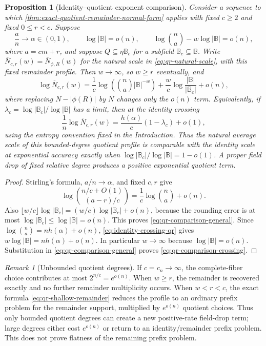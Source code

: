 \documentclass[12pt,a4paper]{amsart}
\numberwithin{equation}{section}
\newtheorem{proposition}[proposition]{Proposition}
\theoremstyle{remark}
\newtheorem{remark}[remark]{Remark}
\newcommand{\B}{\mathbb B}
\begin{document}
\begin{proposition}[Identity--quotient exponent comparison]
\label{prop:identity-quotient-comparison}
Consider a sequence to which
\cref{thm:exact-quotient-remainder-normal-form} applies with fixed
$c\ge2$ and fixed $0\le r<c$.  Suppose
\[
 \frac an\longrightarrow\alpha\in(0,1),\qquad
 \log|\B|=o(n),\qquad
 \log\binom na-w\log|\B|=o(n),                     \tag{QR7}\label{eq:identity-crossing-qr}
\]
where $a=cm+r$, and suppose
\(Q\subseteq\eta\B_c\) for a subfield $\B_c\subseteq\B$.
Write \(\overline N_{c,r}(w)=\overline N_{\phi,R}(w)\) for the natural
scale in \eqref{eq:qr-natural-scale}, with this fixed remainder profile.
Then $w\to\infty$, so $w\ge r$ eventually, and
\[
 \log\overline N_{c,r}(w)
 =\frac1c\log\!\left(\binom na|\B|^{-w}\right)
  +\frac wc\log\frac{|\B|}{|\B_c|}+o(n),           \tag{QR8}\label{eq:qr-comparison-general}
\]
where replacing $N-|\phi(R)|$ by $N$ changes only the $o(n)$ term.
Equivalently, if
\(\lambda_c=\log|\B_c|/\log|\B|\) has a limit, then at the identity
crossing
\[
       \frac1n\log\overline N_{c,r}(w)
       =\frac{h(\alpha)}c(1-\lambda_c)+o(1),         \tag{QR9}\label{eq:qr-comparison-crossing}
\]
using the entropy convention fixed in the Introduction.
Thus the natural average scale of this bounded-degree quotient profile is
comparable with the identity scale at exponential accuracy exactly when
\(\log|\B_c|/\log|\B|=1-o(1)\).  A proper field drop of fixed relative
degree produces a positive exponential quotient term.
\end{proposition}

\begin{proof}
Stirling's formula, $a/n\to\alpha$, and fixed $c,r$ give
\[
 \log\binom{n/c+O(1)}{(a-r)/c}
 =\frac1c\log\binom na+o(n).
\]
Also
\(\lfloor w/c\rfloor\log|\B_c|
=(w/c)\log|\B_c|+o(n)\), because the rounding error is at most
\(\log|\B_c|\le\log|\B|=o(n)\).  This proves
\eqref{eq:qr-comparison-general}.  Since
\(\log\binom na=nh(\alpha)+o(n)\),
\eqref{eq:identity-crossing-qr} gives
\(w\log|\B|=nh(\alpha)+o(n)\).  In particular $w\to\infty$ because
\(\log|\B|=o(n)\).  Substitution in
\eqref{eq:qr-comparison-general} proves
\eqref{eq:qr-comparison-crossing}.
\end{proof}

\begin{remark}[Unbounded quotient degrees]
If $c=c_n\to\infty$, the complete-fiber choice contributes at most
\(2^{n/c}=e^{o(n)}\).  When $w\ge r$, the remainder is recovered exactly
and no further remainder multiplicity occurs.  When $w<r<c$, the exact
formula \eqref{eq:qr-shallow-remainder} reduces the profile to an ordinary
prefix problem for the remainder support, multiplied by $e^{o(n)}$
quotient choices.  Thus only bounded quotient degrees can create a new
positive-rate field-drop term; large degrees either cost $e^{o(n)}$ or
return to an identity/remainder prefix problem.  This does not prove
flatness of the remaining prefix problem.
\end{remark}
\end{document}
